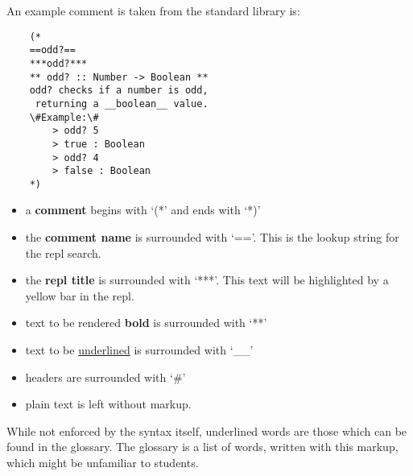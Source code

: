 An example comment is taken from the standard library is:

\begin{verbatim}
    (*
    ==odd?==
    ***odd?***
    ** odd? :: Number -> Boolean **
    odd? checks if a number is odd, 
     returning a __boolean__ value.
    \#Example:\#
        > odd? 5
        > true : Boolean
        > odd? 4
        > false : Boolean
    *)
\end{verbatim}

\begin{itemize}
    \item a \textbf{comment} begins with `(*' and ends with `*)'
    \item the \textbf{comment name} is surrounded with `=='. This is the lookup string for the repl
        search.
    \item the \textbf{repl title} is surrounded with `***'. This text will be highlighted by a yellow
        bar in the repl.
    \item text to be rendered \textbf{bold} is surrounded with `**'
    \item text to be \underline{underlined} is surrounded with `__'
    \item headers are surrounded with `\#' 
    \item plain text is left without markup.
\end{itemize}

While not enforced by the syntax itself, underlined words are those which can be found in the
glossary. The glossary is a list of words, written with this markup, which might be unfamiliar to
students.
